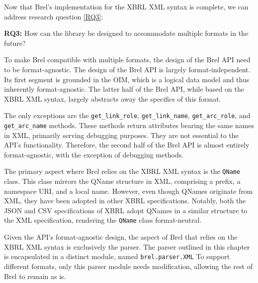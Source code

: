 Now that Brel's implementation for the XBRL XML syntax is complete, we can address research question \ref{RQ3}:

\begin{displayquote}
    \textbf{RQ3:} How can the library be designed to accommodate multiple formats in the future?
\end{displayquote}

To make Brel compatible with multiple formats, the design of the Brel API need to be format-agnostic. 
The design of the Brel API is largely format-independent. 
Its first segment is grounded in the OIM, which is a logical data model and thus inherently format-agnostic.
The latter half of the Brel API, while based on the XBRL XML syntax, largely abstracts away the specifics of this format. 

The only exceptions are the \texttt{get\_link\_role}, \texttt{get\_link\_name}, \texttt{get\_arc\_role}, and \texttt{get\_arc\_name} methods.
These methods return attributes bearing the same names in XML, primarily serving debugging purposes.
They are not essential to the API's functionality.
Therefore, the second half of the Brel API is almost entirely format-agnostic, with the exception of debugging methods.

The primary aspect where Brel relies on the XBRL XML syntax is the \texttt{QName} class.
This class mirrors the QName structure in XML, comprising a prefix, a namespace URI, and a local name. 
However, even though QNames originate from XML, they have been adopted in other XBRL specifications.
Notably, both the JSON\cite{xbrl_json} and CSV\cite{xbrl_csv} specifications of XBRL adopt QNames in a similar structure to the XML specification, 
rendering the \texttt{QName} class format-neutral.

Given the API's format-agnostic design, the aspect of Brel that relies on the XBRL XML syntax is exclusively the parser. 
The parser outlined in this chapter is encapsulated in a distinct module, named \texttt{brel.parser.XML}
To support different formats, only this parser module needs modification, allowing the rest of Brel to remain as is.
